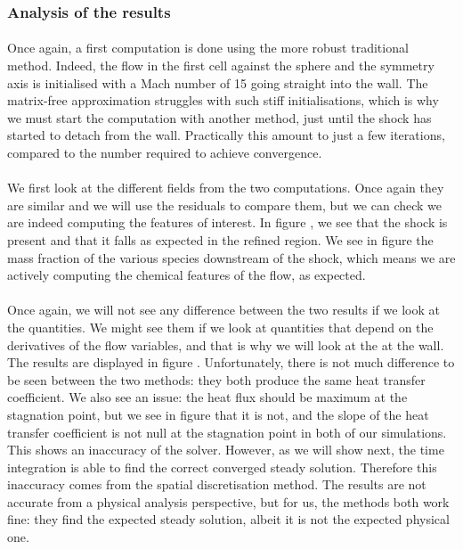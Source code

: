       \subsubsection{Analysis of the results}

        \paragraph{}
        Once again, a first computation is done using the more robust traditional method.
        Indeed, the flow in the first cell against the sphere and the symmetry axis is initialised with a Mach number of 15 going straight into the wall.
        The matrix-free approximation struggles with such stiff initialisations, which is why we must start the computation with another method, just until the shock has started to detach from the wall.
        Practically this amount to just a few iterations, compared to the number required to achieve convergence.

        \paragraph{}
        We first look at the different fields from the two computations.
        Once again they are similar and we will use the residuals to compare them, but we can check we are indeed computing the features of interest.
        In figure , we see that the shock is present and that it falls as expected in the refined region.
        We see in figure  the mass fraction of the various species downstream of the shock, which means we are actively computing the chemical features of the flow, as expected.

        \paragraph{}
        Once again, we will not see any difference between the two results if we look at the  quantities.
        We might see them if we look at quantities that depend on the derivatives of the flow variables, and that is why we will look at the  at the wall.
        The results are displayed in figure .
        Unfortunately, there is not much difference to be seen between the two methods: they both produce the same heat transfer coefficient.
        We also see an issue: the heat flux should be maximum at the stagnation point, but we see in figure  that it is not, and the slope of the heat transfer coefficient is not null at the stagnation point in both of our simulations.
        This shows an inaccuracy of the solver.
        However, as we will show next, the time integration is able to find the correct converged steady solution.
        Therefore this inaccuracy comes from the spatial discretisation method.
        The results are not accurate from a physical analysis perspective, but for us, the methods both work fine: they find the expected steady solution, albeit it is not the expected physical one.

